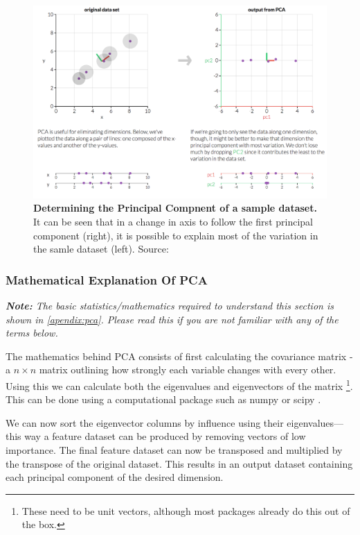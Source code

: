 \begin{figure}[H]
    \centering
    \includegraphics[width=\textwidth]{./4fig/pca2d.png}
    \caption{\textbf{Determining the Principal Compnent of a sample dataset.} It can be seen that in a change in axis to follow the first principal component (right), it is possible to explain most of the variation in the samle dataset (left). Source: \citep{pcaim}}
    \label{fig:2dpca}
\end{figure}


\subsubsection{Mathematical Explanation Of PCA}
\emph{\textbf{Note:} The basic statistics/mathematics required to understand this section is shown in \autoref{apendix:pca}. Please read this if you are not familiar with any of the terms below.
}

The mathematics behind PCA consists of first calculating the covariance matrix - a $n \times n$ matrix outlining how strongly each variable changes with every other. Using this we can calculate both the eigenvalues and eigenvectors of the matrix \footnote{These need to be unit vectors, although most packages already do this out of the box.}. This can be done using a computational package such as numpy or scipy \citep{numpy,scipy}.

We can now sort the eigenvector columns by influence using their eigenvalues—this way a feature dataset can be produced by removing vectors of low importance. The final feature dataset can now be transposed and multiplied by the transpose of the original dataset. This results in an output dataset containing each principal component of the desired dimension.



